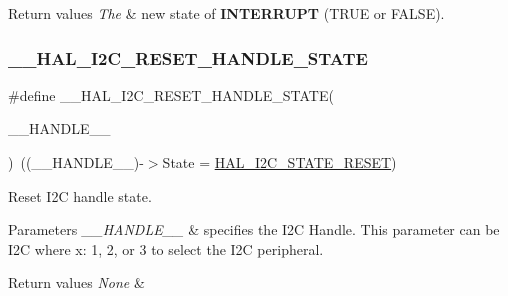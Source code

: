 \begin{DoxyRetVals}{Return values}
{\em The} & new state of {\bfseries I\+N\+T\+E\+R\+R\+U\+PT} (T\+R\+UE or F\+A\+L\+SE). \\
\hline
\end{DoxyRetVals}
\mbox{\label{group___i2_c___exported___macros_ga74c8fd72a78882720c28448ce8bd33d8}} 
\subsubsection{\texorpdfstring{\+\_\+\+\_\+\+H\+A\+L\+\_\+\+I2\+C\+\_\+\+R\+E\+S\+E\+T\+\_\+\+H\+A\+N\+D\+L\+E\+\_\+\+S\+T\+A\+TE}{\_\_HAL\_I2C\_RESET\_HANDLE\_STATE}}
{\footnotesize\ttfamily \#define \+\_\+\+\_\+\+H\+A\+L\+\_\+\+I2\+C\+\_\+\+R\+E\+S\+E\+T\+\_\+\+H\+A\+N\+D\+L\+E\+\_\+\+S\+T\+A\+TE(\begin{DoxyParamCaption}\item[{}]{\+\_\+\+\_\+\+H\+A\+N\+D\+L\+E\+\_\+\+\_\+ }\end{DoxyParamCaption})~((\+\_\+\+\_\+\+H\+A\+N\+D\+L\+E\+\_\+\+\_\+)-\/$>$State = \mbox{\hyperlink{group___i2_c___exported___types_ggaef355af8eab251ae2a19ee164ad81c37a91ba08634e08d7287940f1bc5a37eeff}{H\+A\+L\+\_\+\+I2\+C\+\_\+\+S\+T\+A\+T\+E\+\_\+\+R\+E\+S\+ET}})}



Reset I2C handle state. 


\begin{DoxyParams}{Parameters}
{\em \+\_\+\+\_\+\+H\+A\+N\+D\+L\+E\+\_\+\+\_\+} & specifies the I2C Handle. This parameter can be I2C where x\+: 1, 2, or 3 to select the I2C peripheral. \\
\hline
\end{DoxyParams}

\begin{DoxyRetVals}{Return values}
{\em None} & \\
\hline
\end{DoxyRetVals}
